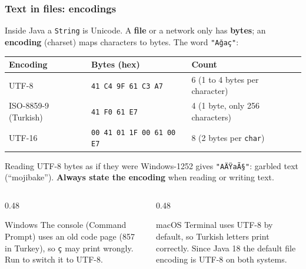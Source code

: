 \documentclass[aspectratio=169,10pt,compress]{beamer}
\begin{document}
\begin{frame}[t,fragile] \frametitle{Text in files: encodings}
  \small Inside Java a \texttt{String} is Unicode. A \textbf{file} or a network only has \textbf{bytes};
  an \textbf{encoding} (charset) maps characters to bytes. The word \texttt{"Ağaç"}:

  \vspace{0.3em}
  \begin{tabular}{@{}lll@{}}
    \toprule
    \textbf{Encoding} & \textbf{Bytes (hex)}                     & \textbf{Count} \\
    \midrule
    UTF-8             & \texttt{41 C4 9F 61 C3 A7}               & 6 \quad (1 to 4 bytes per character) \\
    ISO-8859-9 (Turkish) & \texttt{41 F0 61 E7}                  & 4 \quad (1 byte, only 256 characters) \\
    UTF-16            & \texttt{00 41 01 1F 00 61 00 E7}         & 8 \quad (2 bytes per \texttt{char}) \\
    \bottomrule
  \end{tabular}

  \vspace{0.3em}
  Reading UTF-8 bytes as if they were Windows-1252 gives \texttt{"AÄŸaÃ§"}: garbled text (``mojibake'').
  \textbf{Always state the encoding} when reading or writing text.

  \vspace{0.3em}
  \begin{columns}[T]
    \begin{column}{0.48\textwidth}
      \begin{block}{Windows}
        \footnotesize The console (Command Prompt) uses an old code page (857 in Turkey), so \texttt{ç} may print wrongly.
        Run  to switch it to UTF-8.
      \end{block}
    \end{column}
    \begin{column}{0.48\textwidth}
      \begin{block}{macOS}
        \footnotesize Terminal uses UTF-8 by default, so Turkish letters print correctly.
        Since Java 18 the default file encoding is UTF-8 on both systems.
      \end{block}
    \end{column}
  \end{columns}
\end{frame}
\end{document}
